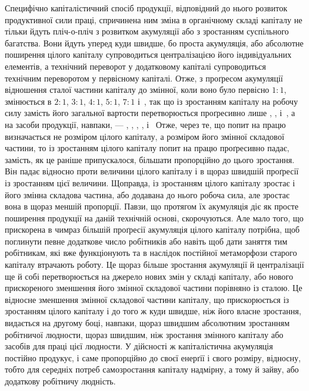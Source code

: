Специфічно капіталістичний спосіб продукції, відповідний
до нього розвиток продуктивної сили праці, спричинена ним
зміна в органічному складі капіталу не тільки йдуть пліч-о-пліч
з розвитком акумуляції або з зростанням суспільного багатства.
Вони йдуть уперед куди швидше, бо проста акумуляція,
або абсолютне поширення цілого капіталу супроводиться централізацією
його індивідуальних елементів, а технічний переворот
у додатковому капіталі супроводиться технічним переворотом
у первісному капіталі. Отже, з проґресом акумуляції
відношення сталої частини капіталу до змінної, коли воно було
первісно $1: 1$, змінюється в $2: 1$, $3: 1$, $4: 1$, $5: 1$, $7: 1$ і~,
так що із зростанням капіталу на робочу силу замість  його
загальної вартости перетворюється проґресивно лише , ,
   і~, а на засоби продукції, навпаки, — , , ,
,  і~ Отже, через те, що попит на працю визначається не
розміром цілого капіталу, а розміром його змінної складової
частини, то із зростанням цілого капіталу попит на працю проґресивно
падає, замість, як це раніше припускалося, більшати
пропорційно до цього зростання. Він падає відносно проти величини
цілого капіталу і в щораз швидшій проґресії із зростанням
цієї величини. Щоправда, із зростанням цілого капіталу зростає
і його змінна складова частина, або додавана до нього робоча
сила, але зростає вона в щораз меншій пропорції. Павзи, що протягом
їх акумуляція діє як просте поширення продукції на
даній технічній основі, скорочуються. Але мало того, що прискорена
в чимраз більшій проґресії акумуляція цілого капіталу
потрібна, щоб поглинути певне додаткове число робітників або
навіть щоб дати заняття тим робітникам, які вже функціонують
та в наслідок постійної метаморфози старого капіталу втрачають
роботу. Це щораз більше зростання акумуляції й централізації
ще й собі перетворюється на джерело нових змін у складі капіталу,
або нового прискореного зменшення його змінної складової
частини порівняно із сталою. Це відносне зменшення змінної
складової частини капіталу, що прискорюється із зростанням
цілого капіталу і до того ж куди швидше, ніж його власне зростання,
видається на другому боці, навпаки, щораз швидшим
абсолютним зростанням робітничої людности, щораз швидшим,
ніж зростання змінного капіталу або засобів для праці цієї людности.
У дійсності ж капіталістична акумуляція постійно продукує,
і саме пропорційно до своєї енерґії і свого розміру, відносну,
тобто для середніх потреб самозростання капіталу надмірну,
а тому й зайву, або додаткову робітничу людність.

